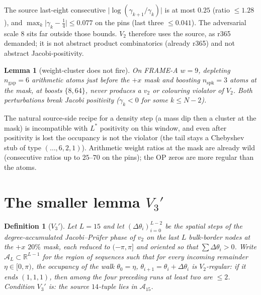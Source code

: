 \documentclass[11pt]{article}
\newtheorem{lemma}{Lemma}
\newtheorem{definition}{Definition}
\theoremstyle{remark}
\newcommand{\R}{\mathbb{R}}
\begin{document}
The source last-eight consecutive $\lvert\log(\gamma_{k+1}/\gamma_k)\rvert$
is at most $0.25$ (ratio $\le 1.28$), and
$\max_k\lvert\gamma_k-\tfrac14\rvert\le 0.077$ on the pins
(last three $\le 0.041$).  The adversarial scale $8$ sits far
outside those bounds.  $V_2$ therefore uses the source, as
r365 demanded; it is not abstract product combinatorics
(already r365) and not abstract Jacobi-positivity.

\begin{lemma}[weight-cluster does not fire]\label{lem:weight-adv}
On FRAME-A $w=9$, depleting $n_{\mathrm{gap}}=6$ arithmetic
atoms just before the $+x$ mask and boosting
$n_{\mathrm{spk}}=3$ atoms at the mask, at boosts $\{8,64\}$,
never produces a $v_2$ or colouring violator of $V_2$.  Both
perturbations break Jacobi positivity ($\gamma_k<0$ for some
$k\le N-2$).
\end{lemma}

The natural source-side recipe for a density step (a mass dip
then a cluster at the mask) is incompatible with $L^*$
positivity on this window, and even after positivity is lost
the occupancy is not the violator (the tail stays a Chebyshev
stub of type $(\ldots,6,2,1)$).  Arithmetic weight ratios at
the mask are already wild (consecutive ratios up to $25$--$70$
on the pins); the OP zeros are more regular than the atoms.

\section{The smaller lemma \texorpdfstring{$V_3'$}{V3'}}\label{sec:v3}

\begin{definition}[$V_3'$]\label{def:v3}
Let $L=15$ and let $(\Delta\theta_i)_{i=0}^{L-2}$ be the
spatial steps of the degree-accumulated Jacobi--Pr\"ufer phase
of $v_2$ on the last $L$ bulk-border nodes at the $+x$
$20\%$ mask, each reduced to $(-\pi,\pi]$ and oriented so that
$\sum\Delta\theta_i>0$.  Write $\mathcal{A}_L\subset\R^{L-1}$
for the region of sequences such that for every incoming
remainder $\eta\in[0,\pi)$, the occupancy of the walk
$\theta_0=\eta$, $\theta_{i+1}=\theta_i+\Delta\theta_i$ is
$V_2$-regular: if it ends $(1,1,1)$, then among the four
preceding runs at least two are $\le 2$.
Condition $V_3'$ is: the source $14$-tuple lies in
$\mathcal{A}_{15}$.
\end{definition}
\end{document}
